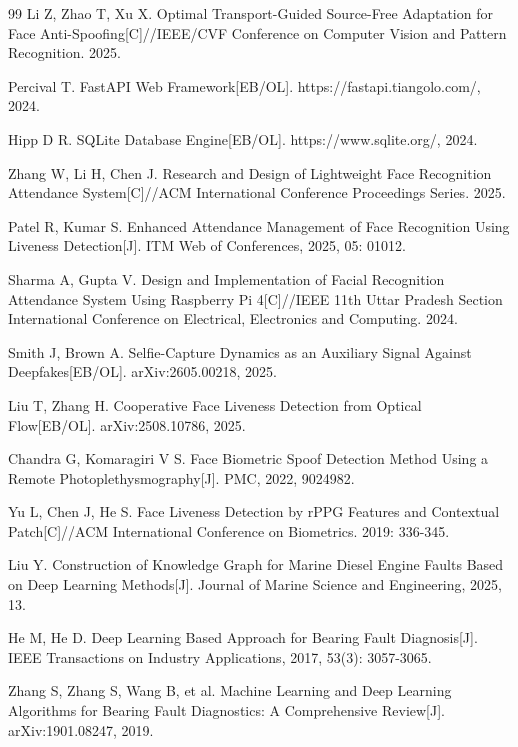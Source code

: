 \documentclass{heuthesis}
\begin{document}
\begin{thebibliography}{99}
Li Z, Zhao T, Xu X. Optimal Transport-Guided Source-Free Adaptation for Face Anti-Spoofing[C]//IEEE/CVF Conference on Computer Vision and Pattern Recognition. 2025.

Percival T. FastAPI Web Framework[EB/OL]. https://fastapi.tiangolo.com/, 2024.

Hipp D R. SQLite Database Engine[EB/OL]. https://www.sqlite.org/, 2024.

Zhang W, Li H, Chen J. Research and Design of Lightweight Face Recognition Attendance System[C]//ACM International Conference Proceedings Series. 2025.

Patel R, Kumar S. Enhanced Attendance Management of Face Recognition Using Liveness Detection[J]. ITM Web of Conferences, 2025, 05: 01012.

Sharma A, Gupta V. Design and Implementation of Facial Recognition Attendance System Using Raspberry Pi 4[C]//IEEE 11th Uttar Pradesh Section International Conference on Electrical, Electronics and Computing. 2024.

Smith J, Brown A. Selfie-Capture Dynamics as an Auxiliary Signal Against Deepfakes[EB/OL]. arXiv:2605.00218, 2025.

Liu T, Zhang H. Cooperative Face Liveness Detection from Optical Flow[EB/OL]. arXiv:2508.10786, 2025.

Chandra G, Komaragiri V S. Face Biometric Spoof Detection Method Using a Remote Photoplethysmography[J]. PMC, 2022, 9024982.

Yu L, Chen J, He S. Face Liveness Detection by rPPG Features and Contextual Patch[C]//ACM International Conference on Biometrics. 2019: 336-345.

Liu Y. Construction of Knowledge Graph for Marine Diesel Engine Faults Based on Deep Learning Methods[J]. Journal of Marine Science and Engineering, 2025, 13.

He M, He D. Deep Learning Based Approach for Bearing Fault Diagnosis[J]. IEEE Transactions on Industry Applications, 2017, 53(3): 3057-3065.

Zhang S, Zhang S, Wang B, et al. Machine Learning and Deep Learning Algorithms for Bearing Fault Diagnostics: A Comprehensive Review[J]. arXiv:1901.08247, 2019.


\end{thebibliography}
\end{document}
